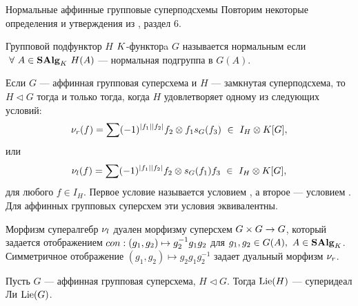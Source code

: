 \begin{subsection}{Нормальные аффинные групповые суперподсхемы}
  Повторим некоторые определения и утверждения из \cite{affine_quotients}, раздел 6.
  \newline

  \begin{definition}
    Групповой подфунктор $ H $ $K$-функторa $ G $ называется нормальным
    если $ ~\forall ~A \in \mathbf{SAlg}_K ~H(A) $ --- нормальная подгруппа в $ G(A) $.
  \end{definition}

  Если $ G $ --- аффинная групповая суперсхема и $ H $ ---
  замкнутая суперподсхема, то $ H \lhd G $ тогда и только тогда, когда
  $ H $ удовлетворяет одному из следующих условий:
  \begin{align*}
    \mnu_r(f) = \sum \sgn{f_1}{f_2} f_2 \o f_1 \mci_G(f_3) ~\in ~I_H \o \K[G],
  \end{align*}
  или
  \begin{align*}
    \mnu_l(f) = \sum \sgn{f_1}{f_2} f_2 \o \mci_G(f_1) f_3 ~\in ~I_H \o \K[G],
  \end{align*}
  для любого $ f \in I_H $. Первое условие называется условием
  , а второе --- условием .
  Для аффинных групповых суперсхем эти условия эквивалентны.

  Морфизм супералгебр $ \nu_l $ дуален морфизму суперсхем $ G \times G \to G $,
  который задается отображением $ con: (g_1, g_2) \mapsto g_2^{-1} g_1 g_2 $ для
  $ g_1, g_2 \in G(A), ~A \in \mathbf{SAlg}_K $. Симметричное отображение
  $ (g_1, g_2) \mapsto g_2 g_1 g_2^{-1} $ задает дуальный морфизм $ \nu_r $.

  \begin{lemma}\label{Lie(H) - superideal}
    Пусть $ G $ --- аффинная групповая суперсхема, $ H \lhd G $. Тогда
    $ \mathrm{Lie}(H) $ --- суперидеал Ли $ \mathrm{Lie}(G) $.
  \end{lemma}


\end{subsection}

